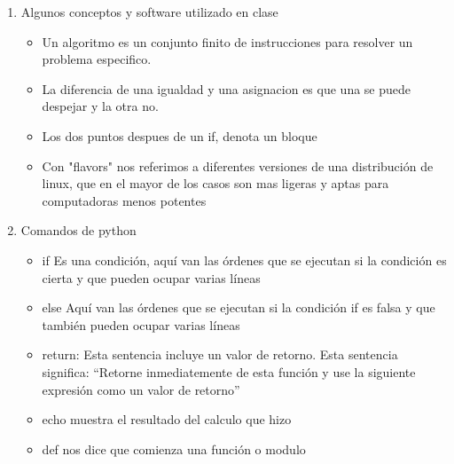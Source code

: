 \documentclass{book}
\begin{document}
\begin{enumerate}%
	\item Algunos conceptos y software utilizado en clase%
	\begin{itemize}
		\item Un algoritmo es un conjunto finito de instrucciones para resolver un problema especifico.
		\item La diferencia de una igualdad y una asignacion es que una se puede despejar y la otra no.			
		\item Los dos puntos despues de un if, denota un bloque
		\item Con "flavors" nos referimos a diferentes versiones de una distribución de linux, que en el mayor de los casos son mas ligeras y aptas para computadoras menos potentes
		
	\end{itemize}
	
	\item Comandos de python%
	\begin{itemize}%
		\item if Es una condición, aquí van las órdenes que se ejecutan si la condición es cierta
		y que pueden ocupar varias líneas
		\item else Aquí van las órdenes que se ejecutan si la condición if es falsa y que también pueden ocupar varias líneas
		\item return: Esta sentencia incluye un valor de retorno. Esta sentencia significa: “Retorne inmediatemente de esta función y use la siguiente expresión como un valor de retorno”
		\item echo muestra el resultado del calculo que hizo
		\item def nos dice que comienza una función o modulo
		
		
		

\end{itemize}
\end{enumerate}
\end{document}

